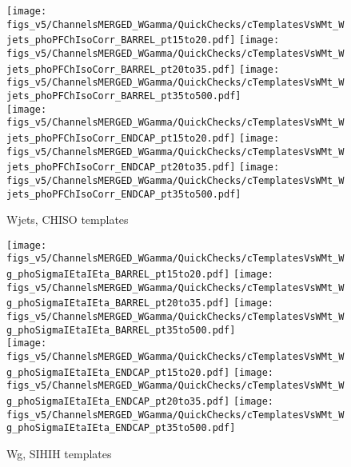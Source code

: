 \begin{figure}[htb]
  \begin{center}
  \texttt{[image: figs\_v5/ChannelsMERGED\_WGamma/QuickChecks/cTemplatesVsWMt\_Wjets\_phoPFChIsoCorr\_BARREL\_pt15to20.pdf]} \texttt{[image: figs\_v5/ChannelsMERGED\_WGamma/QuickChecks/cTemplatesVsWMt\_Wjets\_phoPFChIsoCorr\_BARREL\_pt20to35.pdf]} \texttt{[image: figs\_v5/ChannelsMERGED\_WGamma/QuickChecks/cTemplatesVsWMt\_Wjets\_phoPFChIsoCorr\_BARREL\_pt35to500.pdf]}\\
  \texttt{[image: figs\_v5/ChannelsMERGED\_WGamma/QuickChecks/cTemplatesVsWMt\_Wjets\_phoPFChIsoCorr\_ENDCAP\_pt15to20.pdf]} \texttt{[image: figs\_v5/ChannelsMERGED\_WGamma/QuickChecks/cTemplatesVsWMt\_Wjets\_phoPFChIsoCorr\_ENDCAP\_pt20to35.pdf]} \texttt{[image: figs\_v5/ChannelsMERGED\_WGamma/QuickChecks/cTemplatesVsWMt\_Wjets\_phoPFChIsoCorr\_ENDCAP\_pt35to500.pdf]}\\
  \caption{Wjets, CHISO templates}
  \label{fig:templatesVsWMt_Wjets_CHISO}
  \end{center}
\end{figure}

\begin{figure}[htb]
  \begin{center}
  \texttt{[image: figs\_v5/ChannelsMERGED\_WGamma/QuickChecks/cTemplatesVsWMt\_Wg\_phoSigmaIEtaIEta\_BARREL\_pt15to20.pdf]} \texttt{[image: figs\_v5/ChannelsMERGED\_WGamma/QuickChecks/cTemplatesVsWMt\_Wg\_phoSigmaIEtaIEta\_BARREL\_pt20to35.pdf]} \texttt{[image: figs\_v5/ChannelsMERGED\_WGamma/QuickChecks/cTemplatesVsWMt\_Wg\_phoSigmaIEtaIEta\_BARREL\_pt35to500.pdf]}\\
  \texttt{[image: figs\_v5/ChannelsMERGED\_WGamma/QuickChecks/cTemplatesVsWMt\_Wg\_phoSigmaIEtaIEta\_ENDCAP\_pt15to20.pdf]} \texttt{[image: figs\_v5/ChannelsMERGED\_WGamma/QuickChecks/cTemplatesVsWMt\_Wg\_phoSigmaIEtaIEta\_ENDCAP\_pt20to35.pdf]} \texttt{[image: figs\_v5/ChannelsMERGED\_WGamma/QuickChecks/cTemplatesVsWMt\_Wg\_phoSigmaIEtaIEta\_ENDCAP\_pt35to500.pdf]}\\
  \caption{Wg, SIHIH templates}
  \label{fig:templatesVsWMt_Wg_SIHIH}
  \end{center}
\end{figure}

